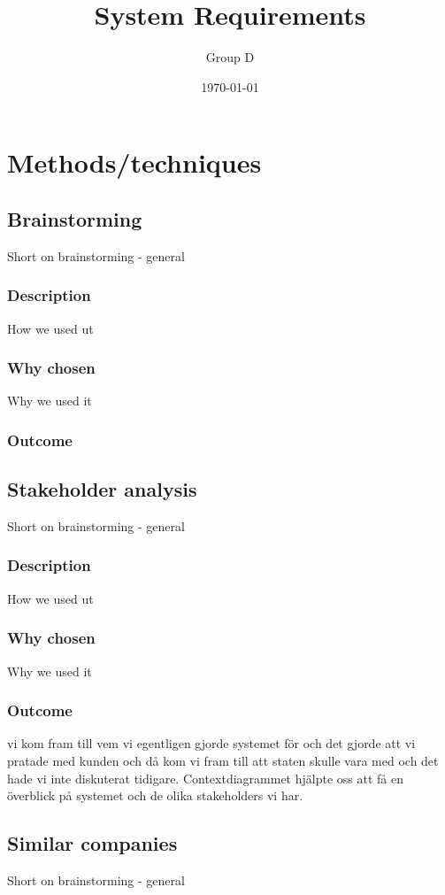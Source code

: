 \documentclass[a4paper]{article}
\title{System Requirements}
\author{Group D}
\date{\today}
\begin{document}
  \tableofcontents

  \section{Methods/techniques}
  \subsection{Brainstorming}
  Short on brainstorming - general
    \subsubsection{Description}
    How we used ut
    \subsubsection{Why chosen}
    Why we used it
    \subsubsection{Outcome}
    
    \subsection{Stakeholder analysis}
  Short on brainstorming - general
    \subsubsection{Description}
    How we used ut
    \subsubsection{Why chosen}
    Why we used it
    \subsubsection{Outcome}
    vi kom fram till vem vi egentligen gjorde systemet för och det gjorde att vi pratade med kunden och då kom vi fram till att staten skulle vara med och det hade vi inte diskuterat tidigare. 
Contextdiagrammet hjälpte oss att få en överblick på systemet och de olika stakeholders vi har.
    
    \subsection{Similar companies}
  Short on brainstorming - general
\end{document}
